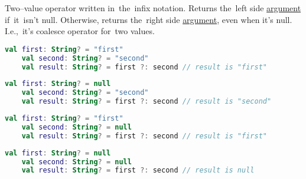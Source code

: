 Two--value operator written in~the~infix notation.
Returns the~left side \hyperref[parameterargument]{argument} if~it~isn't null.
Otherwise, returns the~right side \hyperref[parameterargument]{argument}, even when it's null.
I.e.,~it's coalesce operator for~two values.

\begin{lstlisting}[language=Kotlin]
    val first: String? = "first"
    val second: String? = "second"
    val result: String? = first ?: second // result is "first"
\end{lstlisting}

\begin{lstlisting}[language=Kotlin]
    val first: String? = null
    val second: String? = "second"
    val result: String? = first ?: second // result is "second"
\end{lstlisting}
\newpage

\begin{lstlisting}[language=Kotlin]
    val first: String? = "first"
    val second: String? = null
    val result: String? = first ?: second // result is "first"
\end{lstlisting}

\begin{lstlisting}[language=Kotlin]
    val first: String? = null
    val second: String? = null
    val result: String? = first ?: second // result is null
\end{lstlisting}
